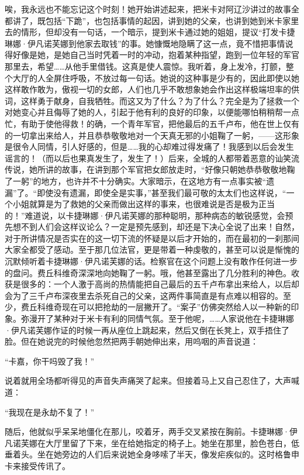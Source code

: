 \par 唉，我永远也不能忘记这个时刻！她开始讲述起来，把米卡对阿辽沙讲过的故事全都讲了，既包括“下跪”，也包括事情的起因，讲到她的父亲，也讲到她到米卡家里去的情形，但却没有一句话，一个暗示，提到米卡通过她的姐姐，提议“打发卡捷琳娜·伊凡诺芙娜到他家去取钱”的事。她慷慨地隐瞒了这一点，竟不惜把事情说得好像是她，是她自己当时凭着一时的冲动，抱着某种指望，跑到一位年轻的军官那里去，希望……从他手里借钱。这真是使人震惊。我听着，身上发冷，打颤，整个大厅的人全屏住呼吸，不放过每一句话。她说的这种事是少有的，因此即使以她这样敢作敢为，傲视一切的女郎，人们也几乎不敢想象她会作出这样极端坦率的供词，这样勇于献身，自我牺牲。而这又为了什么？为了什么？完全是为了拯救一个对她变心并且侮辱了她的人，引起于他有利的良好的印象，以便能哪怕稍稍帮一点忙，有助于使他得救！的确，一个青年军官，把他最后的五千卢布，他在世上仅有的一切拿出来给人，并且恭恭敬敬地对一个天真无邪的小姐鞠了一躬，——这形象是很令人同情，引人好感的，但是……我的心却难过得发痛了！我感到以后会发生谣言的！（而以后也果真发生了，发生了！）后来，全城的人都带着恶意的讪笑流传说，她所讲的故事，在讲到那个军官把女郎放走时，“好像只朝她恭恭敬敬地鞠了一躬”的地方，也许并不十分确实。大家暗示，在这地方有一点事实被“遗漏”了。“即使没有遗漏，即使全是实事，”甚至我们最可敬的太太们也这样说，“一个小姐就算是为了救她的父亲而做出这样的事来，也很难说是否是极为正当的！”难道说，以卡捷琳娜·伊凡诺芙娜的那种聪明，那种病态的敏锐感觉，会预先想不到人们会这样议论么？一定是预先感到，却还是下决心全说了出来！自然，对于所讲情况是否实在的这一切下流的怀疑是以后才开始的，而在最初的一刹那间大家全都受了感动。至于那几位法官，更是带着一种虔敬的，甚至可以说是惭愧的沉默倾听着卡捷琳娜·伊凡诺芙娜的话。检察官在这个问题上没有敢作任何进一步的盘问。费丘科维奇深深地向她鞠了一躬。哦，他甚至露出了几分胜利的神色。收获是很多的：一个人激于高尚的热情能把自己最后的五千卢布拿出来给人，以后却会为了三千卢布深夜里去杀死自己的父亲，这两件事简直是有点难以相容的。至少，费丘科维奇现在可以把抢劫的一层撇开了。“案子”仿佛突然给人以一种新的印象。弥漫开了某种对于米卡有利的同情气氛。至于他呢，……人家说他在卡捷琳娜·伊凡诺芙娜作证的时候一再从座位上跳起来，然后又倒在长凳上，双手捂住了脸。但在她说完的时候他忽然把两手朝她伸出来，用呜咽的声音说道：
\par “卡嘉，你干吗毁了我！”
\par 说着就用全场都听得见的声音失声痛哭了起来。但接着马上又自己忍住了，大声喊道：
\par “我现在是永劫不复了！”
\par 随后，他就似乎呆呆地僵化在那儿，咬着牙，两手交叉紧按在胸前。卡捷琳娜·伊凡诺芙娜在大厅里留了下来，坐在给她指定的椅子上。她坐在那里，脸色苍白，低垂着头。坐在她旁边的人们后来说她全身哆嗦了半天，像发疟疾似的。这时格鲁申卡来接受传讯了。
